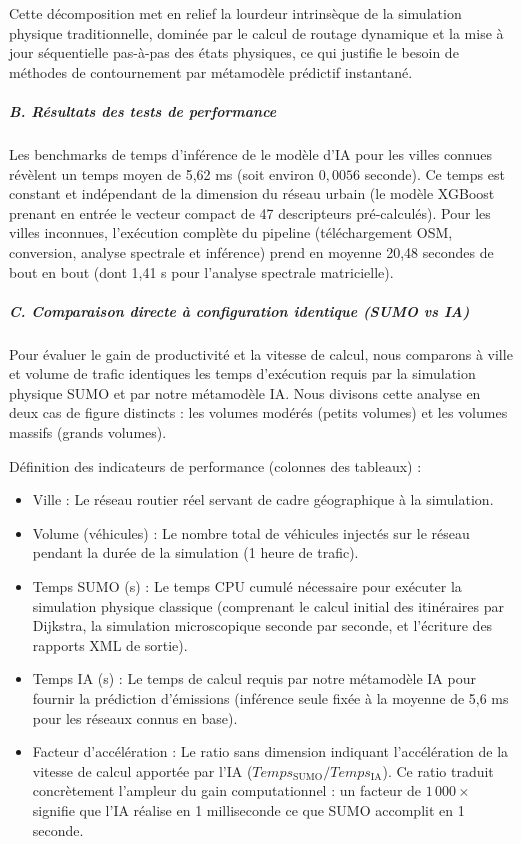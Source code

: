 \documentclass[10pt, a4paper]{article}
\providecommand{\tightlist}{}
\begin{document}
Cette décomposition met en relief la lourdeur intrinsèque de la
simulation physique traditionnelle, dominée par le calcul de routage
dynamique et la mise à jour séquentielle pas-à-pas des états physiques,
ce qui justifie le besoin de méthodes de contournement par métamodèle
prédictif instantané.

\subparagraph{B. Résultats des tests de
performance}\label{b.-ruxe9sultats-des-tests-de-performance}

Les benchmarks de temps d'inférence de le modèle d'IA pour les villes
connues révèlent un temps moyen de 5,62 ms (soit environ \(0,0056\)
seconde). Ce temps est constant et indépendant de la dimension du réseau
urbain (le modèle XGBoost prenant en entrée le vecteur compact de 47
descripteurs pré-calculés). Pour les villes inconnues, l'exécution
complète du pipeline (téléchargement OSM, conversion, analyse spectrale
et inférence) prend en moyenne 20,48 secondes de bout en bout (dont 1,41
s pour l'analyse spectrale matricielle).

\subparagraph{C. Comparaison directe à configuration identique (SUMO vs
IA)}\label{c.-comparaison-directe-uxe0-configuration-identique-sumo-vs-ia}

Pour évaluer le gain de productivité et la vitesse de calcul, nous
comparons à ville et volume de trafic identiques les temps d'exécution
requis par la simulation physique SUMO et par notre métamodèle IA. Nous
divisons cette analyse en deux cas de figure distincts : les volumes
modérés (petits volumes) et les volumes massifs (grands volumes).

Définition des indicateurs de performance (colonnes des tableaux) :

\begin{itemize}
\tightlist
\item
  Ville : Le réseau routier réel servant de cadre géographique à la
  simulation.
\item
  Volume (véhicules) : Le nombre total de véhicules injectés sur le
  réseau pendant la durée de la simulation (1 heure de trafic).
\item
  Temps SUMO (s) : Le temps CPU cumulé nécessaire pour exécuter la
  simulation physique classique (comprenant le calcul initial des
  itinéraires par Dijkstra, la simulation microscopique seconde par
  seconde, et l'écriture des rapports XML de sortie).
\item
  Temps IA (s) : Le temps de calcul requis par notre métamodèle IA pour
  fournir la prédiction d'émissions (inférence seule fixée à la moyenne
  de 5,6 ms pour les réseaux connus en base).
\item
  Facteur d'accélération : Le ratio sans dimension indiquant
  l'accélération de la vitesse de calcul apportée par l'IA
  (\(Temps_{\text{SUMO}} / Temps_{\text{IA}}\)). Ce ratio traduit
  concrètement l'ampleur du gain computationnel : un facteur de
  \(1\,000\times\) signifie que l'IA réalise en 1 milliseconde ce que
  SUMO accomplit en 1 seconde.
\end{itemize}
\end{document}
